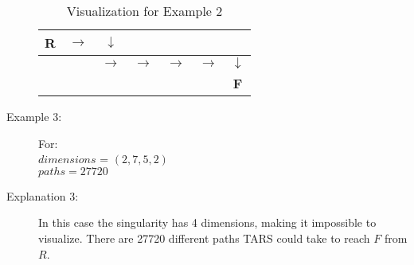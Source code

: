 \begin{description}
    \begin{table}[htbp]
        \centering
        \begin{tabular}{|c|c|c|c|c|c|c|}
            \hline
            \textbf{R} & $\rightarrow$ & $\downarrow$ &  &  &  &  \\
            \hline
             &  & $\rightarrow$ & $\rightarrow$ & $\rightarrow$ & $\rightarrow$ & $\downarrow$ \\
            \hline
             &  &  &  &  &  & \textbf{F} \\
            \hline
        \end{tabular}
        \caption{Visualization for Example 2}
    \end{table}

    \item[Example 3:] For:\\
    $dimensions$ = $(2,7,5,2)$\\
    $paths = 27720$

    \item[Explanation 3:]
    In this case the singularity has 4 dimensions, making it impossible to visualize. There are 27720 different paths TARS could take to reach $F$ from $R$.
\end{description}

